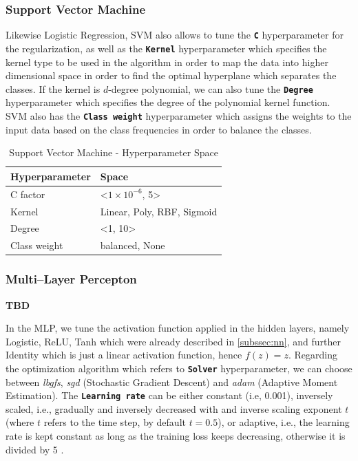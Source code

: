 \subsubsection{Support Vector Machine}
Likewise Logistic Regression, SVM also allows to tune the \textbf{\texttt{C}} hyperparameter for the regularization, as well as the \textbf{\texttt{Kernel}} hyperparameter which specifies the kernel type to be used in the algorithm in order to map the data into higher dimensional space in order to find the optimal hyperplane which separates the classes.
If the kernel is $d$-degree polynomial, we can also tune the \textbf{\texttt{Degree}} hyperparameter which specifies the degree of the polynomial kernel function.
SVM also has the \textbf{\texttt{Class weight}} hyperparameter which assigns the weights to the input data based on the class frequencies in order to balance the classes.


\begin{table}[H]
\small
\setlength{\tabcolsep}{8pt}
\renewcommand{\arraystretch}{1.3}
\centering
    \caption[Support Vector Machine - Hyperparameter Space]{Support Vector Machine - Hyperparameter Space}\label{tab:svmspace}
    \begin{tabular}{ll}
\toprule
\textbf{Hyperparameter} & \textbf{Space}\\
\midrule
\hline
C factor & <$1\times 10^{-6}$, 5> \\
Kernel & Linear, Poly, RBF, Sigmoid \\
Degree & <1, 10> \\
Class weight & balanced, None \\
\hline
\bottomrule
\end{tabular}
\vspace{0.7em}

\vspace{-1em}
\end{table}


\subsubsection{Multi--Layer Percepton}
\textbf{TBD}

In the MLP, we tune the activation function applied in the hidden layers, namely Logistic, ReLU, Tanh which were already described in \autoref{subssec:nn}, and further Identity which is just a linear activation function, hence $f(z) = z$.
Regarding the optimization algorithm which refers to \textbf{\texttt{Solver}} hyperparameter, we can choose between \textit{lbgfs}, \textit{sgd} (Stochastic Gradient Descent) and \textit{adam} (Adaptive Moment Estimation).
The \textbf{\texttt{Learning rate}} can be either constant (i.e, 0.001), inversely scaled, i.e., gradually and inversely decreased with and inverse scaling exponent $t$ (where $t$ refers to the time step, by default $t=0.5$), or adaptive, i.e., the learning rate is kept constant as long as the training loss keeps decreasing, otherwise it is divided by 5 \citep{scikit-mlp}.

